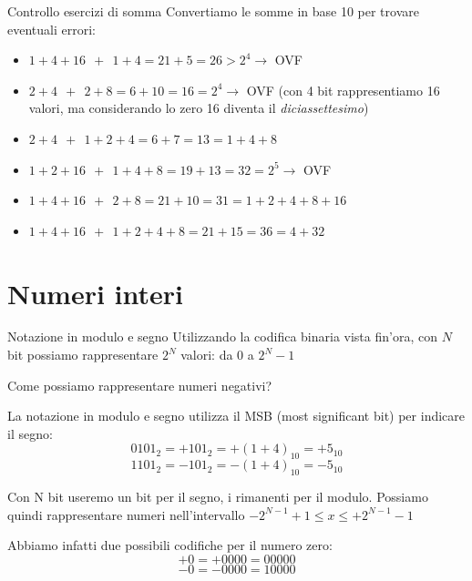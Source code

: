 \documentclass[9pt, format=169, handout]{beamer}
\begin{document}
\begin{frame}{Controllo esercizi di somma}
Convertiamo le somme in base 10 per trovare eventuali errori:

\begin{itemize}
\item $1+4+16 \ \ + \ \ 1+4 = 21+5 = 26 > 2^4 \rightarrow$ \alert{OVF}
\item $2+4 \ \ + \ \ 2+8 = 6+10 = 16 = 2^4 \rightarrow$ \alert{OVF} (con 4 bit rappresentiamo 16 valori, ma considerando lo zero 16 diventa il \emph{diciassettesimo})
\item $2+4 \ \ + \ \ 1+2+4 = 6+7 = 13 = 1+4+8$
\item $1+2+16 \ \ + \ \ 1+4+8 = 19+13 = 32 = 2^5 \rightarrow$ \alert{OVF}
\item $1+4+16 \ \ + \ \ 2+8 = 21+10 = 31 = 1+2+4+8+16$
\item $1+4+16 \ \ + \ \ 1+2+4+8 = 21+15 = 36 = 4+32$
\end{itemize}
\end{frame}

\section{Numeri interi}
\begin{frame}{Notazione in modulo e segno}
Utilizzando la codifica binaria vista fin'ora, con $N$ bit possiamo rappresentare $2^N$ valori: da 0 a $2^N - 1$

Come possiamo rappresentare numeri negativi?

\pause

La notazione in modulo e segno utilizza il \alert{MSB} (most significant bit) per indicare il segno:
\[0101_2 = +101_2 = +(1+4)_{10} = +5_{10}\]
\[1101_2 = -101_2 = -(1+4)_{10} = -5_{10}\]

\pause

Con N bit useremo un bit per il segno, i rimanenti per il modulo.
Possiamo quindi rappresentare numeri nell'intervallo $-2^{N-1}+1 \leq x \leq +2^{N-1}-1$

\pause

Abbiamo infatti due possibili codifiche per il numero zero:
\[+0 = +0000 = 00000\]
\[-0 = -0000 = 10000\]
\end{frame}
\end{document}
